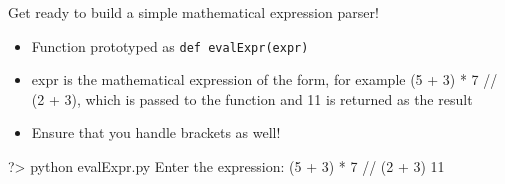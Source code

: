 \documentclass{42-en}
\begin{document}
\makeheaderfiles

Get ready to build a simple mathematical expression parser!

		\begin{itemize}\itemsep1pt
			\item Function prototyped as \texttt{def evalExpr(expr)}
			\item expr is the mathematical expression of the form, for example (5 + 3) * 7 // (2 + 3), which is passed to the function and 11 is returned as the result
			\item Ensure that you handle brackets as well!
        	\end{itemize}
	
		\begin{42console}
			?> python evalExpr.py
			Enter the expression: (5 + 3) * 7 // (2 + 3)
			11
		\end{42console}

\end{document}

